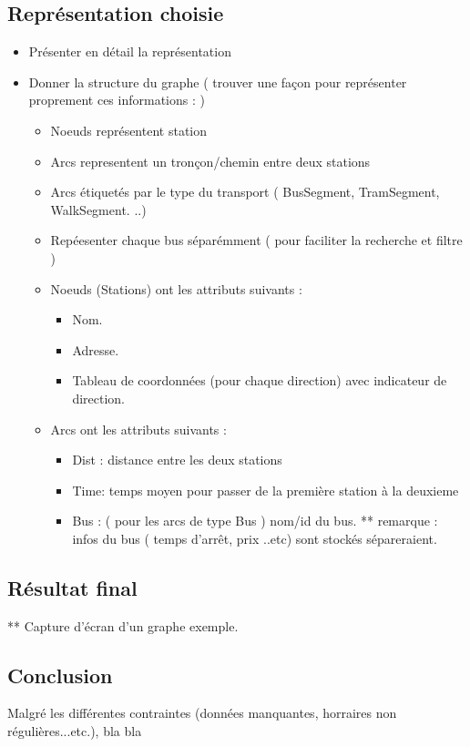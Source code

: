 \subsection{Représentation choisie}
	\begin{itemize}
	\item Présenter en détail la représentation
	\item Donner la structure du graphe ( trouver une façon pour représenter proprement ces informations : )
	\begin{itemize}
		 \item Noeuds représentent station
		 \item Arcs representent un tronçon/chemin entre deux stations
		 \item Arcs étiquetés par le type du transport ( BusSegment, TramSegment, WalkSegment. ..) 
		 \item Repéesenter chaque bus séparémment ( pour faciliter la recherche et filtre ) 
		 \item Noeuds (Stations) ont les attributs suivants : 
		 \begin{itemize}
		 	\item Nom.
		 	\item Adresse.
		 	\item Tableau de coordonnées (pour chaque direction) avec indicateur de direction.
		 \end{itemize}
		 \item Arcs ont les attributs suivants :
		 \begin{itemize}
		 		\item Dist : distance entre les deux stations
		 		\item Time: temps moyen pour passer de la première station à la deuxieme
		 		\item Bus : ( pour les arcs de type Bus ) nom/id du bus.
		 		** remarque : infos du bus ( temps d'arrêt, prix ..etc) sont stockés sépareraient.
		 \end{itemize}
	\end{itemize}
	\end{itemize}

\subsection{Résultat final}
	** Capture d'écran d'un graphe exemple.

\subsection{Conclusion}

Malgré les différentes contraintes (données manquantes, horraires non régulières...etc.), bla bla 